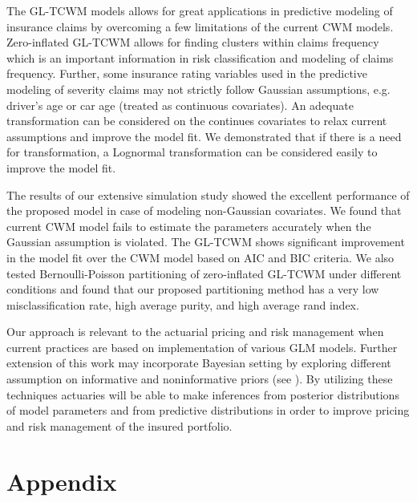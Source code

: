 \documentclass[11pt,letterpaper]{article}
\numberwithin{equation}{section}
\numberwithin{equation}{section}
\numberwithin{equation}{section}
\begin{document}
The GL-TCWM models allows for great applications in predictive modeling of insurance claims by overcoming a few limitations of the current CWM models. Zero-inflated GL-TCWM allows for finding clusters within claims frequency which is an important information in risk classification and modeling of claims frequency. Further, some insurance rating variables used in the predictive modeling of severity claims may not strictly follow Gaussian assumptions, e.g. driver's age or car age (treated as continuous covariates). An adequate transformation can be considered on the continues covariates to relax current assumptions and improve the model fit. We demonstrated that if there is a need for transformation, a Lognormal transformation can be considered easily to improve the model fit. 

The results of our extensive simulation study showed the excellent performance of the proposed model in case of modeling non-Gaussian covariates. We found  that current CWM model fails to estimate the parameters accurately when the Gaussian assumption is violated. The GL-TCWM shows significant improvement in the model fit over the CWM model based on AIC and BIC criteria. We also tested Bernoulli-Poisson partitioning of zero-inflated GL-TCWM under different conditions and found that our proposed partitioning method has a very low misclassification rate, high average purity, and high average rand index.

Our approach is relevant to the actuarial pricing and risk management when current practices are based on implementation of various GLM models. Further extension of this work may incorporate Bayesian setting by exploring different assumption on informative and noninformative priors (see \cite{Ibrahim+Laud:1991}). By utilizing these techniques actuaries will be able to make inferences from posterior distributions of model parameters and from predictive distributions in order to improve pricing and risk management of the insured portfolio. 

\section{Appendix}
\end{document}
